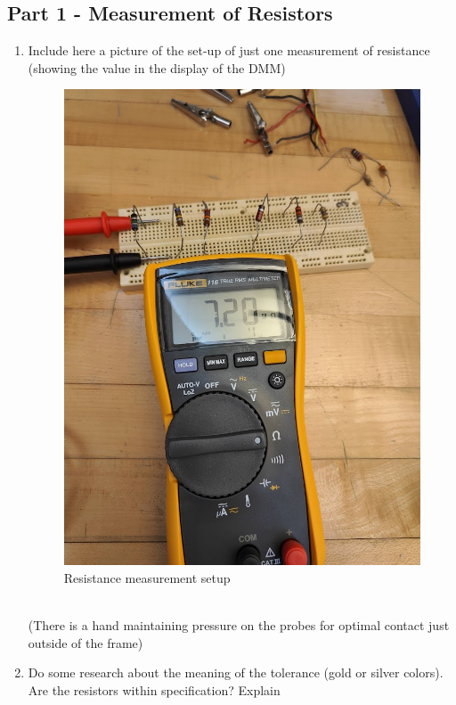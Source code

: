 \documentclass[titlepage]{article}
\begin{document}
\subsection*{Part 1 - Measurement of Resistors}
    \begin{enumerate} 
        \item Include here a picture of the set-up of just one measurement of resistance (showing the value in the display of the DMM)
            \begin{figure}[hbt!]
                \centering
                \caption{Resistance measurement setup}
                \includegraphics[scale = 0.2]{questions/measurement}
            \end{figure} 
            \\(There is a hand maintaining pressure on the probes for optimal contact just outside of the frame)

        \item Do some research about the meaning of the tolerance (gold or silver colors). Are the resistors within specification? Explain\\
    \end{enumerate}
    \FloatBarrier
\end{document}

